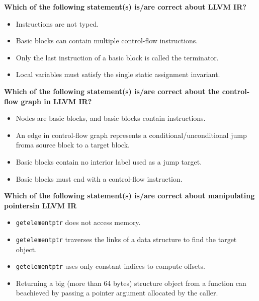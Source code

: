 \textbf{Which of the following statement(s) is/are correct about LLVM IR?}
\begin{itemize}
\item[\textcolor{red}{W}] Instructions are not typed.
\item[\textcolor{red}{W}] Basic blocks can contain multiple control-flow instructions.
\item[\textcolor{green}{C}] Only the last instruction of a basic block is called the terminator.
\item[\textcolor{green}{C}] Local variables must satisfy the single static assignment invariant.
\end{itemize}


\textbf{Which of the following statement(s) is/are correct about the control-flow graph in LLVM IR?}
\begin{itemize}

\item[\textcolor{green}{C}] Nodes are basic blocks, and basic blocks contain instructions.
\item[\textcolor{green}{C}] An edge in control-flow graph represents a conditional/unconditional jump froma source block to a target block.
\item[\textcolor{green}{C}] Basic blocks contain no interior label used as a jump target.
\item[\textcolor{green}{C}] Basic blocks must end with a control-flow instruction.
\end{itemize}



\textbf{Which of the following statement(s) is/are correct about manipulating pointersin LLVM IR}
\begin{itemize}

\item[\textcolor{green}{C}] \texttt{getelementptr} does not access memory.
\item[\textcolor{red}{W}] \texttt{getelementptr} traverses the links of a data structure to find the target object.
\item[\textcolor{red}{W}] \texttt{getelementptr} uses only constant indices to compute offsets.
\item[\textcolor{green}{C}] Returning a big (more than 64 bytes) structure object from a function can beachieved by passing a pointer argument allocated by the caller.
\end{itemize}



